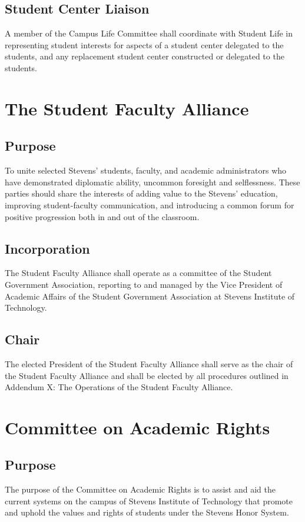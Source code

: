 \documentclass[12pt]{scrreprt}
\begin{document}
\subsection{Student Center Liaison}
A member of the Campus Life Committee shall coordinate with Student Life in 
representing student interests for aspects of a student center delegated to 
the students, and any replacement student center constructed or delegated to 
the students.

\section{The Student Faculty Alliance}

\subsection{Purpose}
To unite selected Stevens’ students, faculty, and academic administrators who have
demonstrated diplomatic ability, uncommon foresight and selflessness. These parties
should share the interests of adding value to the Stevens’ education, improving student-faculty
communication, and introducing a common forum for positive progression both
in and out of the classroom.

\subsection{Incorporation}
The Student Faculty Alliance shall operate as a committee of the Student Government
Association, reporting to and managed by the Vice President of Academic Affairs of the
Student Government Association at Stevens Institute of Technology.

\subsection{Chair}
The elected President of the Student Faculty Alliance shall serve as the chair of the
Student Faculty Alliance and shall be elected by all procedures outlined in Addendum
X: The Operations of the Student Faculty Alliance.

\section{Committee on Academic Rights}

\subsection{Purpose}
The purpose of the Committee on Academic Rights is to assist and aid the current
systems on the campus of Stevens Institute of Technology that promote and uphold the
values and rights of students under the Stevens Honor System.
\end{document}

